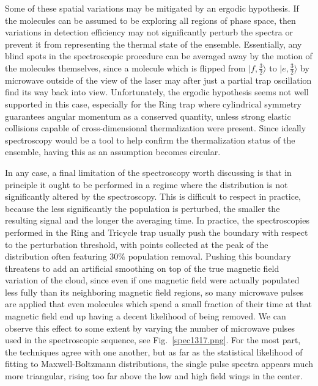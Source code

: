 \documentclass[defaultstyle,11pt]{thesis}
\begin{document}
Some of these spatial variations may be mitigated by an ergodic hypothesis.
If the molecules can be assumed to be exploring all regions of phase space, then variations in detection efficiency may not significantly perturb the spectra or prevent it from representing the thermal state of the ensemble.
Essentially, any blind spots in the spectroscopic procedure can be averaged away by the motion of the molecules themselves, since a molecule which is flipped from $|f, \frac{3}{2}\rangle$ to $|e, \frac{3}{2}\rangle$ by microwave outside of the view of the laser may after just a partial trap oscillation find its way back into view.
Unfortunately, the ergodic hypothesis seems not well supported in this case, especially for the Ring trap where cylindrical symmetry guarantees angular momentum as a conserved quantity, unless strong elastic collisions capable of cross-dimensional thermalization were present.
Since ideally spectroscopy would be a tool to help confirm the thermalization status of the ensemble, having this as an assumption becomes circular.

In any case, a final limitation of the spectroscopy worth discussing is that in principle it ought to be performed in a regime where the distribution is not significantly altered by the spectroscopy.
This is difficult to respect in practice, because the less significantly the population is perturbed, the smaller the resulting signal and the longer the averaging time.
In practice, the spectroscopies performed in the Ring and Tricycle trap usually push the boundary with respect to the perturbation threshold, with points collected at the peak of the distribution often featuring $30\%$ population removal.
Pushing this boundary threatens to add an artificial smoothing on top of the true magnetic field variation of the cloud, since even if one magnetic field were actually populated less fully than its neighboring magnetic field regions, so many microwave pulses are applied that even molecules which spend a small fraction of their time at that magnetic field end up having a decent likelihood of being removed.
We can observe this effect to some extent by varying the number of microwave pulses used in the spectroscopic sequence, see Fig.~\ref{spec1317.png}.
For the most part, the techniques agree with one another, but as far as the statistical likelihood of fitting to Maxwell-Boltzmann distributions, the single pulse spectra appears much more triangular, rising too far above the low and high field wings in the center.

\end{document}

